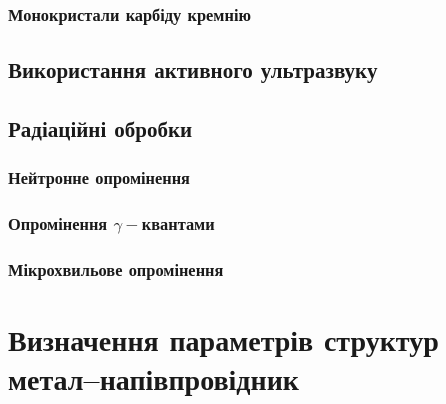\documentclass[a4paper,14pt,oneside,openany]{memoir}
\begin{document}
\subsection{Монокристали карбіду кремнію}

\section{Використання активного ультразвуку}


\section{Радіаційні обробки}
\subsection{Нейтронне опромінення}

\subsection{Опромінення $\gamma-$квантами}

\subsection{Мікрохвильове опромінення}



\chapter{Визначення параметрів структур метал--напівпровідник\label{Ch_MSMethod}}
\end{document}
